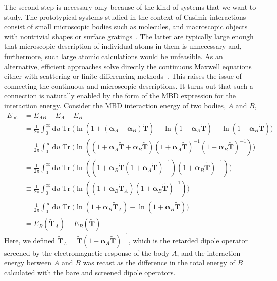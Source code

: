 The second step is necessary only because of the kind of systems that we want to study.
The prototypical systems studied in the context of Casimir interactions consist of small microscopic bodies such as molecules, and macroscopic objects with nontrivial shapes or surface gratings~\cite{RodriguezNP11,WoodsRMP16}.
The latter are typically large enough that microscopic description of individual atoms in them is unnecessary and, furthermore, such large atomic calculations would be unfeasible.
As an alternative, efficient approaches solve directly the continuous Maxwell equations either with scattering or finite-differencing methods~\cite{RodriguezPRA07,RahiPRD09}.
This raises the issue of connecting the continuous and microscopic descriptions.
It turns out that such a connection is naturally enabled by the form of the MBD expression for the interaction energy.
Consider the MBD interaction energy of two bodies, $A$ and $B$,
\begin{equation}
\begin{aligned}
E_\text{int}&=E_{AB}-E_{A}-E_{B} \\
&=\frac1{2\pi}\int_0^\infty\mathrm du\operatorname{Tr}\big(\ln(1+(\boldsymbol\alpha_A+\boldsymbol\alpha_B)\tilde{\mathbf T})-\ln(1+\boldsymbol\alpha_A\tilde{\mathbf T})-\ln(1+\boldsymbol\alpha_B\tilde{\mathbf T})\big) \\
&=\frac1{2\pi}\int_0^\infty\mathrm du\operatorname{Tr}\big(\ln((1+\boldsymbol\alpha_A\tilde{\mathbf T}+\boldsymbol\alpha_B\tilde{\mathbf T})(1+\boldsymbol\alpha_A\tilde{\mathbf T})^{-1}(1+\boldsymbol\alpha_B\tilde{\mathbf T})^{-1})\big) \\
&=\frac1{2\pi}\int_0^\infty\mathrm du\operatorname{Tr}\big(\ln((1+\boldsymbol\alpha_B\tilde{\mathbf T}(1+\boldsymbol\alpha_A\tilde{\mathbf T})^{-1})(1+\boldsymbol\alpha_B\tilde{\mathbf T})^{-1})\big) \\
&\equiv\frac1{2\pi}\int_0^\infty\mathrm du\operatorname{Tr}\big(\ln((1+\boldsymbol\alpha_B\tilde{\mathbf T}_A)(1+\boldsymbol\alpha_B\tilde{\mathbf T})^{-1})\big) \\
&=\frac1{2\pi}\int_0^\infty\mathrm du\operatorname{Tr}\big(\ln(1+\boldsymbol\alpha_B\tilde{\mathbf T}_A)-\ln(1+\boldsymbol\alpha_B\tilde{\mathbf T})\big) \\
&=E_B(\tilde{\mathbf T}_A)-E_B(\tilde{\mathbf T})
\end{aligned}
\label{eq:casimir-mbd}
\end{equation}
Here, we defined $\tilde{\mathbf T}_A=\tilde{\mathbf T}(1+\boldsymbol\alpha_A\tilde{\mathbf T})^{-1}$, which is the retarded dipole operator screened by the electromagnetic response of the body $A$, and the interaction energy between $A$ and $B$ was recast as the difference in the total energy of $B$ calculated with the bare and screened dipole operators.

